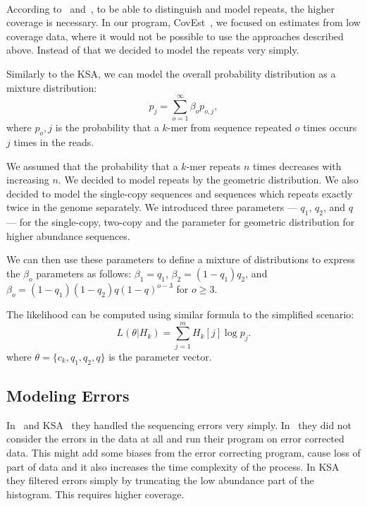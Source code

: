 \paragraph{} According to~\cite{waterman} and~\cite{williams}, to be able to distinguish and model repeats, the higher coverage is necessary. In our program, CovEst~\cite{covest}, we focused on estimates from low coverage data, where it would not be possible to use the approaches described above. Instead of that we decided to model the repeats very simply.

Similarly to the KSA, we can model the overall probability distribution as a mixture distribution:
$$p_j = \sum_{o=1}^\infty \beta_o p_{o,j},$$
where $p_o,j$ is the probability that a $k$-mer from sequence repeated $o$ times occurs $j$ times in the reads.

We assumed that the probability that a $k$-mer repeats $n$ times decreases with increasing $n$. We decided to model repeats by the geometric distribution. We also decided to model the single-copy sequences and sequences which repeats exactly twice in the genome separately. We introduced three parameters --- $q_1$, $q_2$, and $q$ --- for the single-copy, two-copy and the parameter for geometric distribution for higher abundance sequences.

We can then use these parameters to define a mixture of distributions to express the $\beta_o$ parameters as follows:
$\beta_1 = q_1$, $\beta_2 = (1-q_1) q_2$, and $\beta_o =
(1-q_1)(1-q_2)q{(1-q)}^{o-3}$ for $o\ge 3$.

The likelihood can be computed using similar formula to the simplified scenario:
$$L(\theta | H_k) = \sum_{j=1}^m H_k[j] \log p_j.$$
where $\theta = \{c_k, q_1, q_2, q\}$ is the parameter vector.

\subsection{Modeling Errors}

In~\cite{waterman} and KSA~\cite{williams} they handled the sequencing errors very simply. In~\cite{waterman} they did not consider the errors in the data at all and run their program on error corrected data. This might add some biases from the error correcting program, cause loss of part of data and it also increases the time complexity of the process. In KSA they filtered errors simply by truncating the low abundance part of the histogram. This requires higher coverage.

